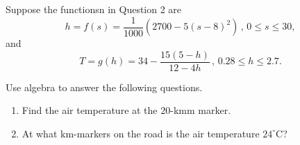 \documentclass{ximera}
\begin{document}
\begin{question} \label{Qfoefe33}
Suppose the functionsn in Question 2 are
\[
    h = f(s) = \frac{1}{1000}\left( 2700 - 5(s-8)^2 \right) \, , \, 0\leq s \leq 30,
\]
and
\[
    T = g(h) = 34 - \frac{15(5-h)}{12-4h} \, , \, 0.28 \leq h \leq 2.7 .
\]

Use algebra to answer the following questions.
\begin{enumerate}
\item Find the air temperature at the $20$-kmm marker.

\item At what km-markers on the road is the air temperature $24^\circ$C?
\end{enumerate}
\end{question}
\end{document}
